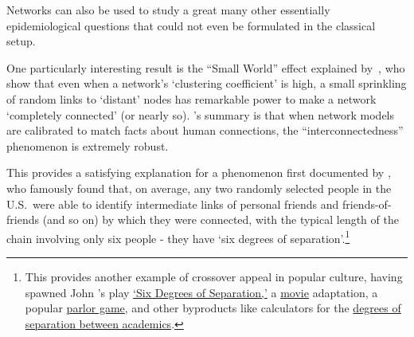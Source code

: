 Networks can also be used to study a great many other essentially epidemiological questions that could not even be formulated in the classical setup. %

\hypertarget{ItsASmallWorldAfterAll}{}

One particularly interesting result is the ``Small World'' effect explained by~\cite{wsSmallWorld}, who show that even when a network's `clustering coefficient' is high, a small sprinkling of random links to `distant' nodes has remarkable power to make a network `completely connected' (or nearly so).  \cite{barabasi2016network}'s summary is that when network models are calibrated to match facts about human connections, the ``interconnectedness'' phenomenon is extremely robust.

This provides a satisfying explanation for a phenomenon first documented by \cite{milgram1967small}, who famously found that, on average, any two randomly selected people in the U.S.\ were able to identify intermediate links of personal friends and friends-of-friends (and so on) by which they were connected, with the typical length of the chain involving only six people - they have `six degrees of separation'.\footnote{This provides another example of crossover appeal in popular culture, having spawned John \cite{guareSixDegrees}'s play \href{https://en.wikipedia.org/wiki/Six_Degrees_of_Separation_(play)}{`Six Degrees of Separation,'} a \href{https://en.wikipedia.org/wiki/Six_Degrees_of_Separation_(film)}{movie} adaptation, a popular \href{https://en.wikipedia.org/wiki/Six_Degrees_of_Kevin_Bacon}{parlor game}, and other byproducts like calculators for the \href{https://oakland.edu/enp/}{degrees of separation between academics}.} %


